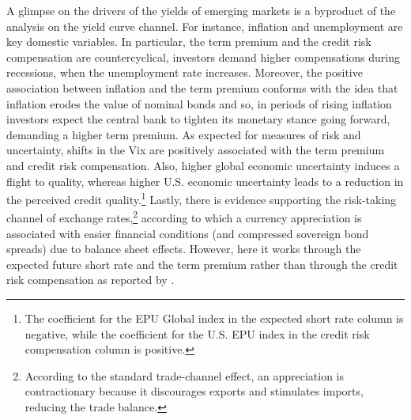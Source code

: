 {A glimpse on the drivers of the yields of emerging markets is a byproduct of the analysis on the yield curve channel.
For instance, inflation and unemployment are key domestic variables.
In particular, the term premium and the credit risk compensation are countercyclical, investors demand higher compensations during recessions, when the unemployment rate increases. 
Moreover, the positive association between inflation and the term premium conforms with the idea that inflation erodes the value of nominal bonds and so, in periods of rising inflation investors expect the central bank to tighten its monetary stance going forward, demanding a higher term premium. 
As expected for measures of risk and uncertainty, shifts in the Vix are positively associated with the term premium and credit risk compensation. %
Also, higher global economic uncertainty induces a flight to quality, whereas higher U.S. economic uncertainty leads to a reduction in the perceived credit quality.\footnote{ The coefficient for the EPU Global index in the expected short rate column is negative, while the coefficient for the U.S. EPU index in the credit risk compensation column is positive.}
Lastly, there is evidence supporting the risk-taking channel of exchange rates,\footnote{ According to the standard trade-channel effect, an appreciation is contractionary because it discourages exports and stimulates imports, reducing the trade balance.} 
according to which a currency appreciation is associated with easier financial conditions (and compressed sovereign bond spreads) due to balance sheet effects.
However, here it works through the expected future short rate and the term premium rather than through the credit risk compensation as reported by \cite{HofmannShimShin:2019}.

}
